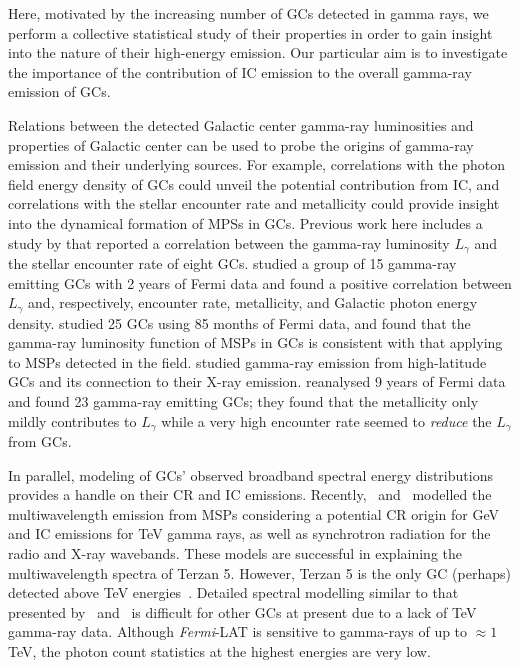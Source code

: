 \documentclass[doublespace,nopageskip]{VTthesis} %
\begin{document}
Here, motivated by the increasing number of GCs detected in gamma rays, we perform a collective statistical study of their properties in order to gain insight into the nature of their high-energy emission. Our particular aim is to investigate the importance of the contribution of IC emission to the overall gamma-ray emission of GCs.

Relations between the detected Galactic center gamma-ray luminosities and properties of Galactic center can be used to probe the origins of gamma-ray emission and their underlying sources. For example, correlations with the photon field energy density of GCs could unveil the potential contribution from IC, and correlations with the stellar encounter rate and metallicity could provide insight into the dynamical formation of MPSs in GCs. Previous work here includes a study by \citet{2010A&A...524A..75A} that reported a correlation between the gamma-ray luminosity $L_\gamma$ and the stellar encounter rate of eight GCs. \citet{2011ApJ...726..100H} studied a group of 15 gamma-ray emitting GCs with 2 years of Fermi data and found a positive correlation between $L_\gamma$ and, respectively, encounter rate, metallicity, and Galactic photon energy density. \citet{2016JCAP...08..018H} studied 25 GCs using 85 months of Fermi data, and found that the gamma-ray luminosity function of MSPs in GCs is consistent with that applying to MSPs detected in the field. \citet{2018MNRAS.480.4782L} studied gamma-ray emission from high-latitude GCs and its connection to their X-ray emission. \citet{2019MNRAS.486..851D} reanalysed 9 years of Fermi data and found 23 gamma-ray emitting GCs; they found that the metallicity only mildly contributes to $L_\gamma$ while a very high encounter rate seemed to {\it reduce} the $L_\gamma$ from GCs.

In parallel, modeling of GCs' observed broadband spectral energy distributions provides a handle on their CR and IC emissions. Recently,~\citet{2013ApJ...779..126K} and~\citet{2019ApJ...880...53N} modelled the multiwavelength emission from MSPs considering a potential CR origin for GeV and IC emissions for TeV gamma rays, as well as synchrotron radiation for the radio and X-ray wavebands. These models are successful in explaining the multiwavelength spectra of Terzan 5. However, Terzan 5 is the only GC (perhaps) detected above TeV energies~\citep{2011A&A...531L..18H}. Detailed spectral modelling similar to that presented by~\citet{2013ApJ...779..126K} and~\citet{2019ApJ...880...53N} is difficult for other GCs at present due to a lack of TeV gamma-ray data. Although \textit{Fermi}-LAT is sensitive to gamma-rays of up to $\approx 1$ TeV, the photon count statistics at the highest energies are very low.
\end{document}
